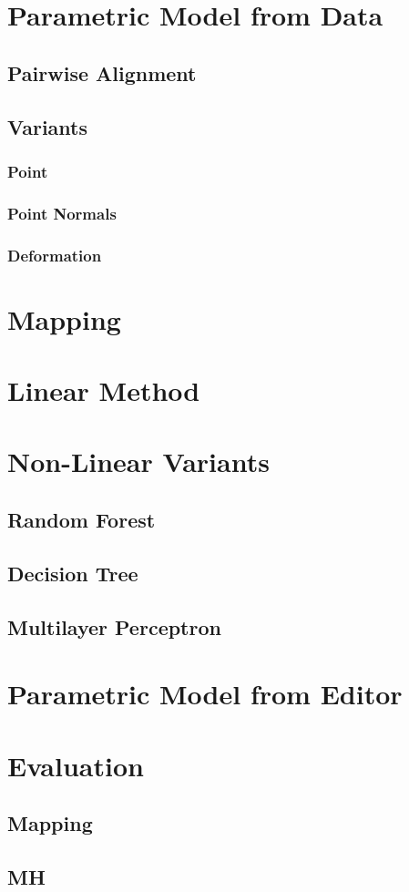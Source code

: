 \section{Parametric Model from Data}
\subsection{Pairwise Alignment}
\subsection{Variants}
\subsubsection{Point}
\subsubsection{Point Normals}
\subsubsection{Deformation}

\section{Mapping}

\section{Linear Method}

\section{Non-Linear Variants}
\subsection{Random Forest}

\subsection{Decision Tree}

\subsection{Multilayer Perceptron}

\section{Parametric Model from Editor}

\section{Evaluation}

\subsection{Mapping}

\subsection{MH}
